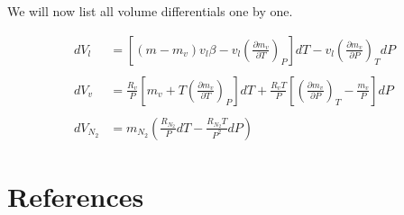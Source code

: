 \documentclass[10pt, letterpaper]{article}
\begin{document}
	We will now list all volume differentials one by one.

	\begin{equation*}
		\begin{aligned}
			dV_{l} &= \left[ (m - m_{v}) v_{l} \beta - v_{l} \left( \frac{\partial{m_{v}}}{\partial{T}} \right)_{P} \right] dT -
			v_{l} \left( \frac{\partial{m_{v}}}{\partial{P}} \right)_{T} dP \\
			\\
			dV_{v} &= \frac{R_{v}}{P} \left[ m_{v} + T \left( \frac{\partial{m_{v}}}{\partial{T}} \right)_{P} \right] dT +
			\frac{R_{v} T}{P} \left[ \left( \frac{\partial{m_{v}}}{\partial{P}} \right)_{T} - \frac{m_{v}}{P} \right] dP \\
			\\
			dV_{N_{2}} &=
			m_{N_{2}} \left( \frac{R_{N_{2}}}{P} dT - \frac{R_{N_{2}} T}{P^{2}} dP \right)
		\end{aligned}
	\end{equation*}

	\section{References}
\end{document}
